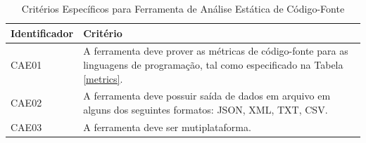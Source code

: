 	\begin{table}[!ht]
	\begin{center}
	 \begin{tabular}{|l|p{10cm}|}
		\hline
		Identificador & Critério 
		\\ \hline
		CAE01 & A ferramenta deve prover as métricas de código-fonte para as linguagens de programação, tal como especificado na Tabela \ref{metrics}.
		\\ \hline
		CAE02 & A ferramenta deve possuir saída de dados em arquivo em alguns dos seguintes formatos: JSON, XML, TXT, CSV.      
		\\ \hline
		CAE03 & A ferramenta deve ser mutiplataforma.
		\\ \hline
		\end{tabular}
		\caption{Critérios Específicos para Ferramenta de Análise Estática de Código-Fonte}
		\label{specific}
		\end{center}
		\end{table}	

